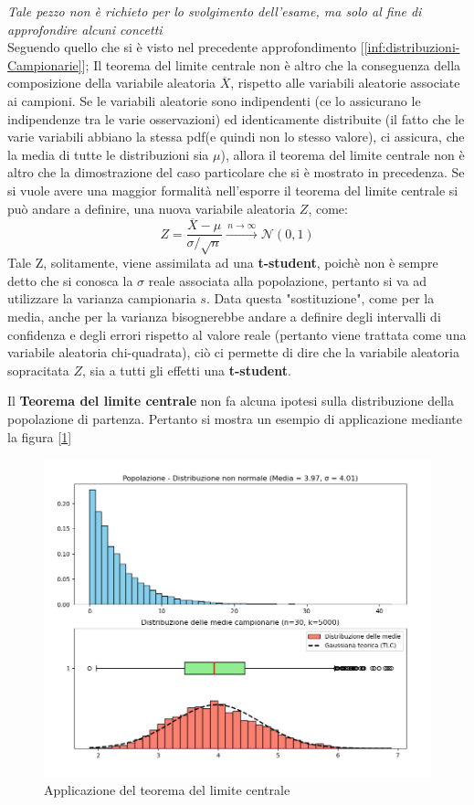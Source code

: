 \begin{info}
\textit{Tale pezzo non è richieto per lo svolgimento dell'esame, ma solo al fine di approfondire alcuni concetti}
\\
Seguendo quello che si è visto nel precedente approfondimento [\ref{inf:distribuzioni-Campionarie}]; Il teorema del limite centrale non è altro che la conseguenza della composizione della variabile aleatoria \(\overline{X}\), rispetto alle variabili aleatorie associate ai campioni. Se le variabili aleatorie sono indipendenti (ce lo assicurano le indipendenze tra le varie osservazioni) ed identicamente distribuite (il fatto che le varie variabili abbiano la stessa pdf(e quindi non lo stesso valore), ci assicura, che la  media di tutte le distribuzioni sia \(\mu\)), allora il teorema del limite centrale non è altro che la dimostrazione del caso particolare che si è mostrato in precedenza. Se si vuole avere una maggior formalità nell'esporre il teorema del limite centrale si può andare a definire, una nuova variabile aleatoria \(Z\), come:
\[
Z = \frac{\overline{X} - \mu}{\sigma / \sqrt{n}} 
\xrightarrow{\,n \to \infty\,} 
\mathcal{N}(0,1)
\]
Tale Z, solitamente, viene assimilata ad una \textbf{t-student}, poichè non è sempre detto che si conosca la \(\sigma\) reale associata alla popolazione, pertanto si va ad utilizzare la varianza campionaria \(s\). Data questa "sostituzione", come per la media, anche per la varianza bisognerebbe andare a definire degli intervalli di confidenza e degli errori rispetto al valore reale (pertanto viene trattata come una variabile aleatoria chi-quadrata), ciò ci permette di dire che la variabile aleatoria sopracitata \(Z\), sia a tutti gli effetti una \textbf{t-student}.
\end{info}

Il \textbf{Teorema del limite centrale} non fa alcuna ipotesi sulla distribuzione della popolazione di partenza. Pertanto si mostra un esempio di applicazione mediante la figura [\ref{img:central-limit}]

\begin{figure}[h]
\centering
\includegraphics[width=.9\textwidth]{img/chapter-4/central-limit.png}
\caption{Applicazione del teorema del limite centrale}\label{img:central-limit}
\end{figure}

